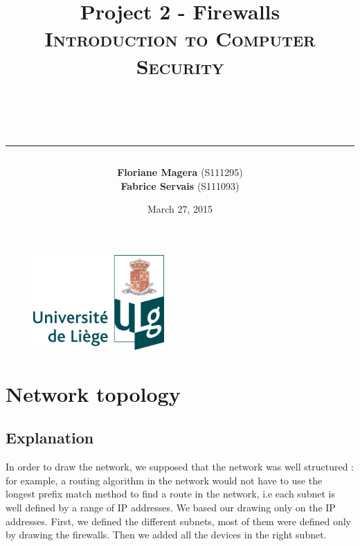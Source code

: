 \documentclass[a4paper,titlepage]{article}
\begin{document}
\begin{titlepage}

\begin{figure}
\centering
\includegraphics[width=5cm]{logo-ulg.png}
\end{figure}



\title{
\vspace{0.2cm}
\LARGE{\textbf{Project 2 - Firewalls}} \\ \textsc{Introduction to Computer Security}
\author{\textbf{Floriane Magera} \small{(S111295})\\\textbf{Fabrice Servais} \small{(S111093})}\\
\date{March 27, 2015}
\rule{15cm}{1.5pt}
}

\end{titlepage}

\pagestyle{fancy}

\maketitle


\section{Network topology}
\subsection{Explanation}
In order to draw the network, we supposed that the network was well structured : for example, a routing algorithm in the network would not have to use the longest prefix match method to find a route in the network, i.e each subnet is well defined by a range of IP addresses. We based our drawing only on the IP addresses. First, we defined the different subnets, most of them were defined only by drawing the firewalls. Then we added all the devices in the right subnet.
\paragraph{}
\end{document}
